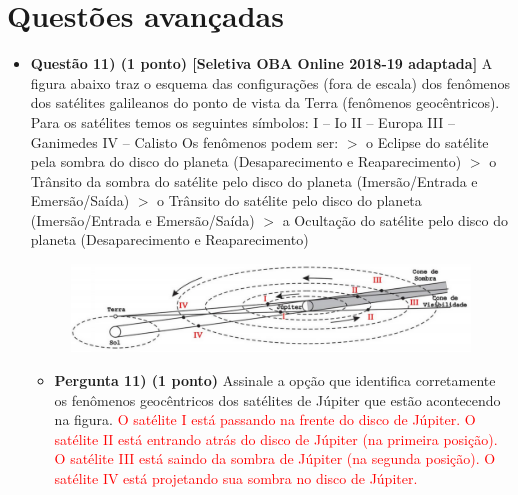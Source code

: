 \documentclass[a4paper, 12pt]{article}
\newcommand{\red}[1]{\textcolor{red}{#1}}
\begin{document}
    \section*{Questões avançadas}
        \begin{flushleft} \begin{itemize}
            \item \textbf{Questão 11) (1 ponto) [Seletiva OBA Online 2018-19 adaptada]} A figura abaixo traz o esquema das configurações (fora de escala) dos fenômenos dos satélites galileanos do ponto de vista da Terra (fenômenos geocêntricos). Para os satélites temos os seguintes símbolos: \linebreak\linebreak I – Io \linebreak II – Europa \linebreak III – Ganimedes \linebreak IV – Calisto \linebreak\linebreak Os fenômenos podem ser: \linebreak $>$ o Eclipse do satélite pela sombra do disco do planeta (Desaparecimento e Reaparecimento) \linebreak $>$ o Trânsito da sombra do satélite pelo disco do planeta (Imersão/Entrada e Emersão/Saída) \linebreak $>$ o Trânsito do satélite pelo disco do planeta (Imersão/Entrada e Emersão/Saída) \linebreak $>$ a Ocultação do satélite pelo disco do planeta (Desaparecimento e Reaparecimento)
                \begin{figure}[H]
                    \centering
                    \includegraphics[scale=0.4]{img/11.png}
                \end{figure}
                \begin{itemize}
                    \item \textbf{Pergunta 11) (1 ponto)} Assinale a opção que identifica corretamente os fenômenos geocêntricos dos satélites de Júpiter que estão acontecendo na figura.
                        \linebreak \red{O satélite I está passando na frente do disco de Júpiter. O satélite II está entrando atrás do disco de Júpiter (na primeira posição). O satélite III está saindo da sombra de Júpiter (na segunda posição). O satélite IV está projetando sua sombra no disco de Júpiter.}

\end{itemize}
\end{itemize}
\end{flushleft}
\end{document}
